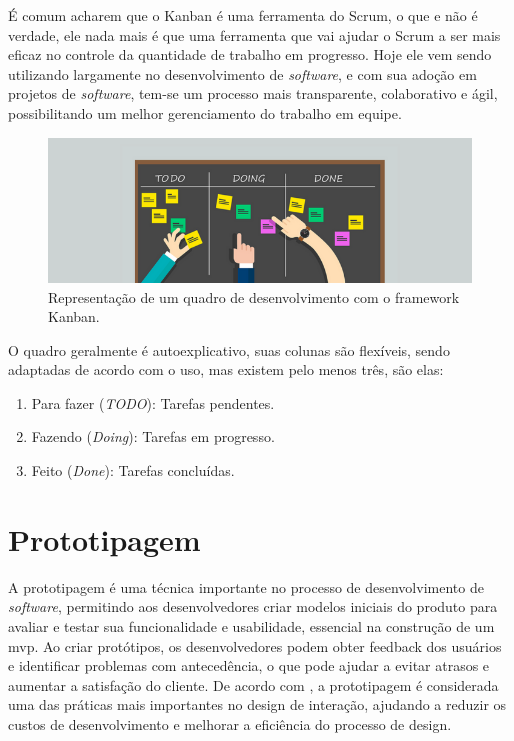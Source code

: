 É comum acharem que o Kanban é uma ferramenta do Scrum, o que e não é verdade, ele nada mais é que uma ferramenta que vai ajudar o Scrum a ser mais eficaz no controle da quantidade de trabalho em progresso. Hoje ele vem sendo utilizando largamente no desenvolvimento de \textit{software}, e com sua adoção em projetos de \textit{software}, tem-se um processo mais transparente, colaborativo e ágil, possibilitando um melhor gerenciamento do trabalho em equipe.

\begin{figure}[h]
\centering
  \includegraphics[width=\columnwidth]{images/kanban.png}
  \caption{Representação de um quadro de desenvolvimento com o framework Kanban.}
  \label{fig:kanban}
\end{figure}

O quadro geralmente é autoexplicativo, suas colunas são flexíveis, sendo adaptadas de acordo com o uso, mas existem pelo menos três, são elas:

\begin{enumerate}
    \item Para fazer (\textit{TODO}): Tarefas pendentes.
    \item Fazendo (\textit{Doing}): Tarefas em progresso.
    \item Feito (\textit{Done}): Tarefas concluídas.
\end{enumerate}

\section{Prototipagem}\label{sec:prototipagem}
A prototipagem é uma técnica importante no processo de desenvolvimento de \textit{software}, permitindo aos desenvolvedores criar modelos iniciais do produto para avaliar e testar sua funcionalidade e usabilidade, essencial na construção de um \ac{mvp}. Ao criar protótipos, os desenvolvedores podem obter feedback dos usuários e identificar problemas com antecedência, o que pode ajudar a evitar atrasos e aumentar a satisfação do cliente. De acordo com \cite{fidel2003user}, a prototipagem é considerada uma das práticas mais importantes no design de interação, ajudando a reduzir os custos de desenvolvimento e melhorar a eficiência do processo de design.

